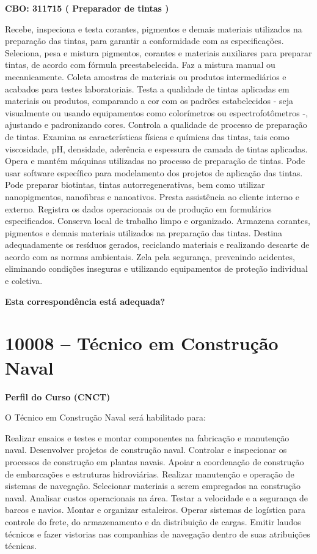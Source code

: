\documentclass[
]{article}
\begin{document}
\textbf{CBO: 311715  ( Preparador de tintas )}

Recebe, inspeciona e testa corantes, pigmentos e demais materiais
utilizados na preparação das tintas, para garantir a conformidade com as
especificações. Seleciona, pesa e mistura pigmentos, corantes e
materiais auxiliares para preparar tintas, de acordo com fórmula
preestabelecida. Faz a mistura manual ou mecanicamente. Coleta amostras
de materiais ou produtos intermediários e acabados para testes
laboratoriais. Testa a qualidade de tintas aplicadas em materiais ou
produtos, comparando a cor com os padrões estabelecidos - seja
visualmente ou usando equipamentos como colorímetros ou
espectrofotômetros -, ajustando e padronizando cores. Controla a
qualidade de processo de preparação de tintas. Examina as
características físicas e químicas das tintas, tais como viscosidade,
pH, densidade, aderência e espessura de camada de tintas aplicadas.
Opera e mantém máquinas utilizadas no processo de preparação de tintas.
Pode usar software específico para modelamento dos projetos de aplicação
das tintas. Pode preparar biotintas, tintas autorregenerativas, bem como
utilizar nanopigmentos, nanofibras e nanoativos. Presta assistência ao
cliente interno e externo. Registra os dados operacionais ou de produção
em formulários especificados. Conserva local de trabalho limpo e
organizado. Armazena corantes, pigmentos e demais materiais utilizados
na preparação das tintas. Destina adequadamente os resíduos gerados,
reciclando materiais e realizando descarte de acordo com as normas
ambientais. Zela pela segurança, prevenindo acidentes, eliminando
condições inseguras e utilizando equipamentos de proteção individual e
coletiva.

\begin{Form}
\textbf{Esta correspondência está adequada?} \\ 
\end{Form}

\newpage
\section{ 10008 -- Técnico em Construção Naval }

\textbf{Perfil do Curso (CNCT)}

O Técnico em Construção Naval será habilitado para:

Realizar ensaios e testes e montar componentes na fabricação e
manutenção naval. Desenvolver projetos de construção naval. Controlar e
inspecionar os processos de construção em plantas navais. Apoiar a
coordenação de construção de embarcações e estruturas hidroviárias.
Realizar manutenção e operação de sistemas de navegação. Selecionar
materiais a serem empregados na construção naval. Analisar custos
operacionais na área. Testar a velocidade e a segurança de barcos e
navios. Montar e organizar estaleiros. Operar sistemas de logística para
controle do frete, do armazenamento e da distribuição de cargas. Emitir
laudos técnicos e fazer vistorias nas companhias de navegação dentro de
suas atribuições técnicas.
\end{document}
